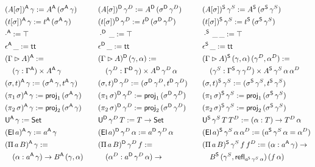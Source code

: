 \documentclass[a4paper,UKenglish,cleveref, autoref]{lipics-v2019}
\begin{document}
\begin{definition}
\begin{alignat*}{10}
    & (A[\sigma])^\A\,\gamma := A^\A\,(\sigma^\A\,\gamma) && && (A[\sigma])^\D\,\gamma^D := A^\D\,(\sigma^\D\,\gamma^D) && && (A[\sigma])^\S\,\gamma^S := A^\S\,(\sigma^\S\,\gamma^S) \\
    & (t[\sigma])^\A\,\gamma := t^\A\,(\sigma^\A\,\gamma) && && (t[\sigma])^\D\,\gamma^D := t^\D\,(\sigma^\D\,\gamma^D) && && (t[\sigma])^\S\,\gamma^S := t^\S\,(\sigma^\S\,\gamma^S) \\
    & \cdot^\A := \top && && \cdot^\D\,\_ := \top && && \cdot^\S\,\_\,\_ := \top \\
    & \epsilon^\A\,\_ := \tt && && \epsilon^\D\,\_ := \tt && && \epsilon^\S\,\_ := \tt \\
    & (\Gamma\rhd A)^\A := && && (\Gamma\rhd A)^\D\,(\gamma,\alpha) :=  && && (\Gamma\rhd A)^\S\,(\gamma,\alpha)\,(\gamma^D,\alpha^D) := \\
    & \hspace{1em} (\gamma:\Gamma^\A)\times A^\A\,\gamma && && \hspace{1em} (\gamma^D:\Gamma^\D\,\gamma)\times A^\D\,\gamma^D\,\alpha && && \hspace{1em} (\gamma^S:\Gamma^\S\,\gamma\,\gamma^D)\times A^\S\,\gamma^S\,\alpha\,\alpha^D \\
    & (\sigma,t)^\A\,\gamma := (\sigma^\A\,\gamma,t^\A\,\gamma) && && (\sigma,t)^\D\,\gamma^D := (\sigma^\D\,\gamma^D,t^\D\,\gamma^D) && && (\sigma,t)^\S\,\gamma^S := (\sigma^\S\,\gamma^S,t^\S\,\gamma^S) \\
    & (\pi_1\,\sigma)^\A\,\gamma := \proj_1\,(\sigma^\A\,\gamma) && && (\pi_1\,\sigma)^\D\,\gamma^D := \proj_1\,(\sigma^\D\,\gamma^D) && && (\pi_1\,\sigma)^\S\,\gamma^S := \proj_1\,(\sigma^\S\,\gamma^S) \\
    & (\pi_2\,\sigma)^\A\,\gamma := \proj_2\,(\sigma^\A\,\gamma) && && (\pi_2\,\sigma)^\D\,\gamma^D := \proj_2\,(\sigma^\D\,\gamma^D) && && (\pi_2\,\sigma)^\S\,\gamma^S := \proj_2\,(\sigma^\S\,\gamma^S) \\
    & \U^\A\,\gamma := \Set && && \U^\D\,\gamma^D\,T := T\ra\Set && && \U^\S\,\gamma^S\,T\,T^D := (\alpha:T)\ra T^D\,\alpha \\
    & (\El\,a)^\A\,\gamma := a^\A\,\gamma && && (\El\,a)^\D\,\gamma^D\,\alpha := a^\D\,\gamma^D\,\alpha && && (\El\,a)^\S\,\gamma^S\,\alpha\,\alpha^D := (a^\S\,\gamma^S\,\alpha = \alpha^D) \\
    & (\Pi\,a\,B)^\A\,\gamma := && && (\Pi\,a\,B)^\D\,\gamma^D\,f := && && (\Pi\,a\,B)^\S\,\gamma^S\,f\,f^D := (\alpha:a^\A\,\gamma)\ra \\
    & \hspace{1em} (\alpha:a^\A\,\gamma)\ra B^\A\,(\gamma,\alpha) && && \hspace{1em}  (\alpha^D:a^\D\,\gamma^D\,\alpha)\ra && && \hspace{1em} B^\S\,(\gamma^S,\refl_{a^\S\,\gamma^S\,\alpha})\,(f\,\alpha)\,\\

\end{alignat*}
\end{definition}
\end{document}
